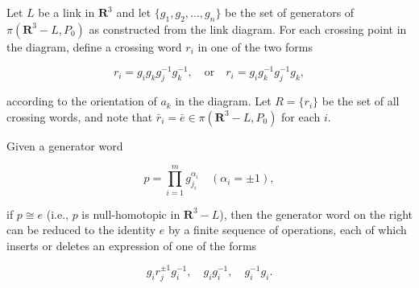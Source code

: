 Let $L$ be a link in $\mathbf{R}^3$ and let $\{g_1, g_2, \ldots, g_n\}$ be the set of generators of $\pi(\mathbf{R}^3 - L, P_0)$ as constructed from the link diagram. For each crossing point in the diagram, define a crossing word $r_i$ in one of the two forms

$$r_i = g_i g_k g_j^{-1} g_k^{-1}, \quad \text{or} \quad r_i = g_i g_k^{-1} g_j^{-1} g_k,$$

according to the orientation of $a_k$ in the diagram. Let $R = \{r_i\}$ be the set of all crossing words, and note that $\bar{r}_i = \bar{e} \in \pi(\mathbf{R}^3 - L, P_0)$ for each $i$.

Given a generator word

$$p = \prod_{i=1}^{m} g_{j_i}^{\alpha_i} \quad (\alpha_i = \pm 1),$$

if $p \cong e$ (i.e., $p$ is null-homotopic in $\mathbf{R}^3 - L$), then the generator word on the right can be reduced to the identity $e$ by a finite sequence of operations, each of which inserts or deletes an expression of one of the forms

$$g_i r_j^{\pm 1} g_i^{-1}, \quad g_i g_i^{-1}, \quad g_i^{-1} g_i.$$
